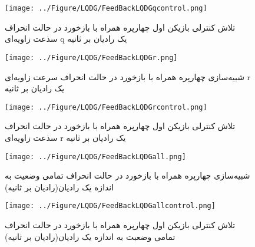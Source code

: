 \begin{figure}[H]
	\texttt{[image: ../Figure/LQDG/FeedBackLQDGqcontrol.png]}
	\centering
	\caption{تلاش کنترلی بازیکن اول چهارپره همراه با بازخورد در حالت انحراف سذعت زاویه‌ای q 
		یک رادیان بر ثانیه}
\end{figure}
\begin{figure}[H]
	\texttt{[image: ../Figure/LQDG/FeedBackLQDGr.png]}
	\centering
	\caption{شبیه‌‌سازی چهارپره همراه با بازخورد در حالت انحراف سرعت زاویه‌ای r 
		یک رادیان بر ثانیه}
\end{figure}
\begin{figure}[H]
	\texttt{[image: ../Figure/LQDG/FeedBackLQDGrcontrol.png]}
	\centering
	\caption{تلاش کنترلی بازیکن اول چهارپره همراه با بازخورد در حالت انحراف سذعت زاویه‌ای r 
		یک رادیان بر ثانیه}
\end{figure}
\begin{figure}[H]
	\texttt{[image: ../Figure/LQDG/FeedBackLQDGall.png]}
	\centering
	\caption{شبیه‌‌سازی چهارپره همراه با بازخورد در حالت انحراف تمامی وضعیت به اندازه یک رادیان(رادیان بر ثانیه)}
\end{figure}
\begin{figure}[H]
	\texttt{[image: ../Figure/LQDG/FeedBackLQDGallcontrol.png]}
	\centering
	\caption{تلاش کنترلی بازیکن اول چهارپره همراه با بازخورد در حالت انحراف تمامی وضعبت به اندازه یک رادیان(رادیان بر ثانیه)  }
\end{figure}